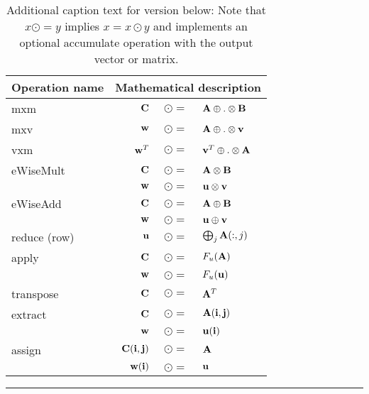 \begin{table}[h]
\begin{center}
~\\
~\\
\caption*{Additional caption text for version below: Note that $x \odot= y$ implies $x = x \odot y$ 
and implements an optional accumulate operation with the output vector or matrix.}
\begin{tabular}{l|rcl}
{\sf Operation name} & \multicolumn{3}{c}{Mathematical description}  \\
\hline
{\sf mxm}          & ${\bf C}$   & $\odot=$ & ${\bf A} \oplus.\otimes {\bf B}$ \\
{\sf mxv}          & ${\bf w}$   & $\odot=$ & ${\bf A} \oplus.\otimes {\bf v}$ \\
{\sf vxm}          & ${\bf w}^T$ & $\odot=$ & ${\bf v}^T \oplus.\otimes {\bf A}$  \\
{\sf eWiseMult}    & ${\bf C}$   & $\odot=$ & ${\bf A} \otimes {\bf B}$ \\
                   & ${\bf w}$   & $\odot=$ & ${\bf u} \otimes {\bf v}$ \\
{\sf eWiseAdd}     & ${\bf C}$   & $\odot=$ & ${\bf A} \oplus {\bf B}$ \\
                   & ${\bf w}$   & $\odot=$ & ${\bf u} \oplus {\bf v}$ \\
{\sf reduce} (row) & ${\bf u}$   & $\odot=$ & $\bigoplus_j{\bf A}(:,j)$  \\
{\sf apply}        & ${\bf C}$   & $\odot=$ & $F_u({\bf A})$ \\
                   & ${\bf w}$   & $\odot=$ & $F_u({\bf u})$ \\
{\sf transpose}    & ${\bf C}$   & $\odot=$ & ${\bf A}^T$ \\
{\sf extract}      & ${\bf C}$   & $\odot=$ & ${\bf A}({\bf i},{\bf j})$ \\
                   & ${\bf w}$   & $\odot=$ & ${\bf u}({\bf i})$ \\
{\sf assign}       & ${\bf C}({\bf i},{\bf j})$ & $\odot=$ &  ${\bf A}$ \\
                   & ${\bf w}({\bf i})$ & $\odot=$ & ${\bf u}$ \\
\end{tabular}

\end{center}
\hrule
\end{table}

